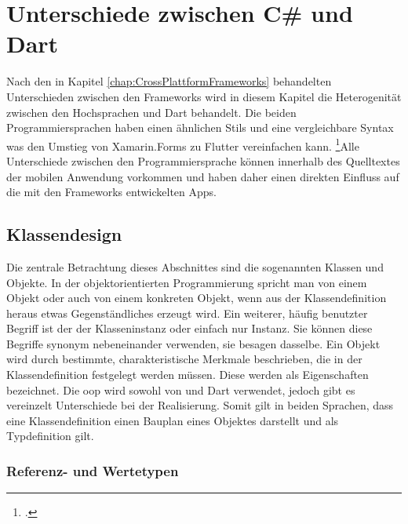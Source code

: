 \chapter{Unterschiede zwischen C\# und Dart}
\label{chap:Programmiersprachen}

Nach den in Kapitel \ref{chap:CrossPlattformFrameworks} behandelten Unterschieden zwischen den Frameworks wird in diesem Kapitel die Heterogenität zwischen den Hochsprachen \Csharp und Dart behandelt.  Die beiden Programmiersprachen haben einen ähnlichen Stils und eine vergleichbare Syntax was den Umstieg von Xamarin.Forms zu Flutter vereinfachen kann.  \footcite[Vgl. ][Abgerufen am \today]{Pedley2019}Alle Unterschiede zwischen den Programmiersprache können innerhalb des Quelltextes der mobilen Anwendung vorkommen und haben daher einen direkten Einfluss auf die mit den Frameworks entwickelten Apps.

\section{Klassendesign}

Die zentrale Betrachtung dieses Abschnittes sind die sogenannten Klassen und Objekte.  In der objektorientierten Programmierung spricht man von einem Objekt oder auch von einem konkreten Objekt, wenn aus der Klassendefinition heraus etwas Gegenständliches erzeugt wird.  Ein weiterer, häufig benutzter Begriff ist der der Klasseninstanz oder einfach nur Instanz. Sie können diese Begriffe synonym nebeneinander verwenden, sie besagen dasselbe.  Ein Objekt wird durch bestimmte,  charakteristische Merkmale beschrieben,  die in der Klassendefinition festgelegt werden müssen.  Diese werden als Eigenschaften bezeichnet.  Die \ac{oop} wird sowohl von \Csharp und Dart verwendet,  jedoch gibt es vereinzelt Unterschiede bei der Realisierung.  Somit gilt in beiden Sprachen, dass eine Klassendefinition einen Bauplan eines Objektes darstellt und als Typdefinition gilt.  

\subsection{Referenz- und Wertetypen}

